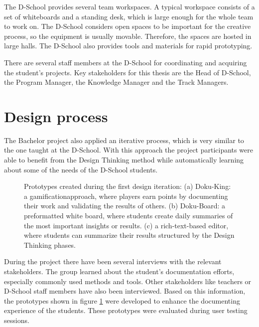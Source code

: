 The D-School provides several team workspaces. A typical workspace consists of a set of whiteboards and a standing desk, which is large enough for the whole team to work on. The D-School considers open spaces to be important for the creative process, so the equipment is usually movable. Therefore, the spaces are hosted in large halls. The D-School also provides tools and materials for rapid prototyping.

There are several staff members at the D-School for coordinating and acquiring the student's projects. Key stakeholders for this thesis are the Head of D-School, the Program Manager, the Knowledge Manager and the Track Managers.

\section{Design process}
The Bachelor project also applied an iterative process, which is very similar to the one taught at the D-School. With this approach the project participants were able to benefit from the Design Thinking method while automatically learning about some of the needs of the D-School students.

\begin{figure}
\caption[Prototypes created during the first design iteration]{Prototypes created during the first design iteration: (a) Doku-King: a gamification\footnotemark approach, where players earn points by documenting their work and validating the results of others. \quad (b) Doku-Board: a preformatted white board, where students create daily summaries of the most important insights or results. \quad (c) a rich-text-based editor, where students can summarize their results structured by the Design Thinking phases.}
\label{fig:First_prototypes}
\end{figure}


During the project there have been several interviews with the relevant stakeholders. The group learned about the student's documentation efforts, especially commonly used methods and tools. Other stakeholders like teachers or D-School staff members have also been interviewed. Based on this information, the prototypes shown in figure \ref{fig:First_prototypes} were developed to enhance the documenting experience of the students. These prototypes were evaluated during user testing sessions.

